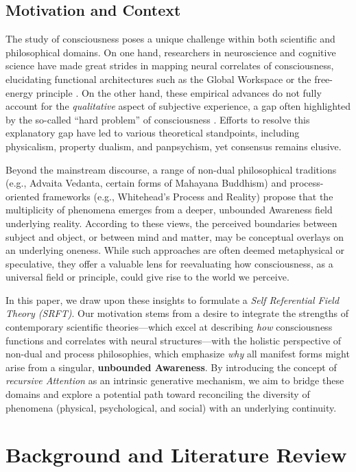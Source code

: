 \documentclass[12pt,a4paper]{article}
\begin{document}
\subsection{Motivation and Context}
\label{sec:motivation-context}

The study of consciousness poses a unique challenge within both scientific and philosophical domains. On one hand, researchers in neuroscience and cognitive science have made great strides in mapping neural correlates of consciousness, elucidating functional architectures such as the Global Workspace \cite{baars1988} or the free-energy principle \cite{friston2010}. On the other hand, these empirical advances do not fully account for the \emph{qualitative} aspect of subjective experience, a gap often highlighted by the so-called ``hard problem'' of consciousness \cite{chalmers1995}. Efforts to resolve this explanatory gap have led to various theoretical standpoints, including physicalism, property dualism, and panpsychism, yet consensus remains elusive.

Beyond the mainstream discourse, a range of non-dual philosophical traditions (e.g., Advaita Vedanta, certain forms of Mahayana Buddhism) and process-oriented frameworks (e.g., Whitehead’s Process and Reality) propose that the multiplicity of phenomena emerges from a deeper, unbounded Awareness field underlying reality. According to these views, the perceived boundaries between subject and object, or between mind and matter, may be conceptual overlays on an underlying oneness. While such approaches are often deemed metaphysical or speculative, they offer a valuable lens for reevaluating how consciousness, as a universal field or principle, could give rise to the world we perceive.

In this paper, we draw upon these insights to formulate a \emph{Self Referential Field Theory (SRFT)}. Our motivation stems from a desire to integrate the strengths of contemporary scientific theories---which excel at describing \emph{how} consciousness functions and correlates with neural structures---with the holistic perspective of non-dual and process philosophies, which emphasize \emph{why} all manifest forms might arise from a singular, \textbf{unbounded Awareness}. By introducing the concept of \emph{recursive Attention} as an intrinsic generative mechanism, we aim to bridge these domains and explore a potential path toward reconciling the diversity of phenomena (physical, psychological, and social) with an underlying continuity.


\section{Background and Literature Review}
\label{sec:lit-review}
\end{document}
